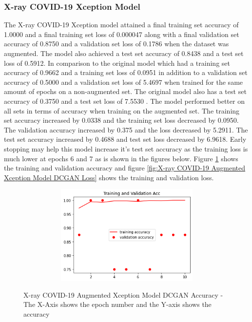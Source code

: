 \subsubsection{X-ray COVID-19 Xception Model}
The X-ray COVID-19 Xception model attained a final training set accuracy of 1.0000 and a final training set loss of 0.000047 along with a final validation set accuracy of 0.8750 and a validation set loss of 0.1786 when the dataset was augmented.  The model also achieved a test set accuracy of 0.8438 and a test set loss of 0.5912.  In comparison to the original model which had a training set accuracy of 0.9662 and a training set loss of 0.0951 in addition to a validation set accuracy of 0.5000 and a validation set loss of 5.4697 when trained for the same amount of epochs on a non-augmented set.  The original model also has a test set accuracy of 0.3750 and a test set loss of 7.5530 .  The model performed better on all sets in terms of accuracy when training on the augmented set.  The training set accuracy increased by 0.0338 and the training set loss decreased by 0.0950. The validation accuracy increased by 0.375 and the loss decreased by 5.2911.  The test set accuracy increased by 0.4688 and test set loss decreased by 6.9618.  Early stopping may help this model increase it's test set accuracy as the training loss is much lower at epochs 6 and 7 as is shown in the figures below.  Figure \ref{fig:X-ray COVID-19 Augmented Xception Model DCGAN Accuracy} shows the training and validation accuracy and figure \ref{fig:X-ray COVID-19 Augmented Xception Model DCGAN Loss} shows the training and validation loss.
 \begin{figure}[H]
    \centering    \includegraphics[width=1\textwidth,height=5cm,keepaspectratio]{Images/XceptionBaselineTrainingValidationAccuracyXRayCOVID19AugmentedDCGAN.png}\\
    \caption{X-ray COVID-19 Augmented Xception Model DCGAN Accuracy - The X-Axis shows the epoch number and the Y-axis shows the accuracy}
    \label{fig:X-ray COVID-19 Augmented Xception Model DCGAN Accuracy}
\end{figure}
